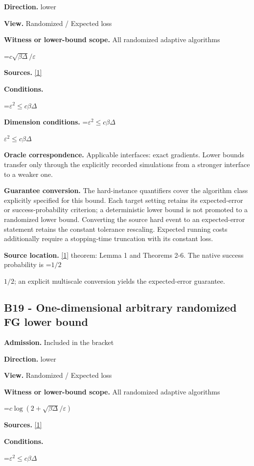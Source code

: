 \documentclass[10pt,a4paper]{article}
\newcommand{\AtlasMath}[1]{\par\begingroup\centering\setbox0=\hbox{$\displaystyle #1$}\ifdim\wd0>1.4\linewidth\typeout{ATLAS WIDE FORMULA: \the\wd0}\fi\ifdim\wd0>\linewidth\resizebox{\linewidth}{!}{\box0}\else\box0\fi\par\endgroup}
\newcommand{\AtlasInlineMath}[1]{\begingroup\setbox0=\hbox{$#1$}\ifdim\wd0>.4\linewidth\endgroup\AtlasMath{#1}\else\endgroup$#1$\fi}
\begin{document}
\textbf{Direction.} lower

\textbf{View.} Randomized / Expected loss

\textbf{Witness or lower-bound scope.} All randomized adaptive algorithms

\AtlasMath{c\sqrt{\beta\Delta}/\varepsilon}
\textbf{Sources.} \href{https://arxiv.org/pdf/2209.07513}{[1]}

\textbf{Conditions.} 


\AtlasMath{\varepsilon^2\le c\beta\Delta}




\textbf{Dimension conditions.} \AtlasInlineMath{\varepsilon^2\le c\beta\Delta}

\textbf{Oracle correspondence.} Applicable interfaces: exact gradients. Lower bounds transfer only through the explicitly recorded simulations from a stronger interface to a weaker one.

\textbf{Guarantee conversion.} The hard-instance quantifiers cover the algorithm class explicitly specified for this bound. Each target setting retains its expected-error or success-probability criterion; a deterministic lower bound is not promoted to a randomized lower bound. Converting the source hard event to an expected-error statement retains the constant tolerance rescaling. Expected running costs additionally require a stopping-time truncation with its constant loss.

\textbf{Source location.} \href{https://arxiv.org/pdf/2209.07513}{[1]} theorem: Lemma 1 and Theorems 2-6. The native success probability is \AtlasInlineMath{1/2}; an explicit multiscale conversion yields the expected-error guarantee.

\subsection{B19 - One-dimensional arbitrary randomized FG lower bound}
\textbf{Admission.} Included in the bracket

\textbf{Direction.} lower

\textbf{View.} Randomized / Expected loss

\textbf{Witness or lower-bound scope.} All randomized adaptive algorithms

\AtlasMath{c\log(2+\sqrt{\beta\Delta}/\varepsilon)}
\textbf{Sources.} \href{https://arxiv.org/pdf/2209.07513}{[1]}

\textbf{Conditions.} 


\AtlasMath{\varepsilon^2\le c\beta\Delta}
\end{document}
